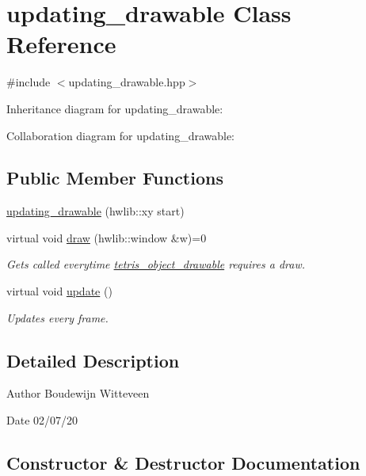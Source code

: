 \hypertarget{classupdating__drawable}{}\section{updating\+\_\+drawable Class Reference}
\label{classupdating__drawable}


{\ttfamily \#include $<$updating\+\_\+drawable.\+hpp$>$}



Inheritance diagram for updating\+\_\+drawable\+:


Collaboration diagram for updating\+\_\+drawable\+:
\subsection*{Public Member Functions}
\begin{DoxyCompactItemize}
\item 
\hyperlink{classupdating__drawable_a889674ead39526e148fb9516f8b0f69a}{updating\+\_\+drawable} (hwlib\+::xy start)
\item 
virtual void \hyperlink{classupdating__drawable_af60a49bab0f1f062d7d38e2d0e89f061}{draw} (hwlib\+::window \&w)=0
\begin{DoxyCompactList}\small\item\em Gets called everytime \hyperlink{classtetris__object__drawable}{tetris\+\_\+object\+\_\+drawable} requires a draw. \end{DoxyCompactList}\item 
virtual void \hyperlink{classupdating__drawable_a15370bdb1a33551803314e87f1371e8d}{update} ()
\begin{DoxyCompactList}\small\item\em Updates every frame. \end{DoxyCompactList}\end{DoxyCompactItemize}


\subsection{Detailed Description}
\begin{DoxyAuthor}{Author}
Boudewijn Witteveen 
\end{DoxyAuthor}
\begin{DoxyDate}{Date}
02/07/20 
\end{DoxyDate}


\subsection{Constructor \& Destructor Documentation}
\mbox{\label{classupdating__drawable_a889674ead39526e148fb9516f8b0f69a}} 
